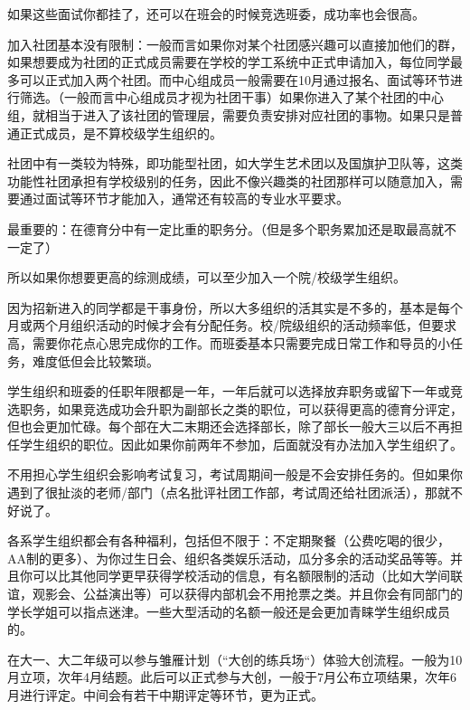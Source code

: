 如果这些面试你都挂了，还可以在班会的时候竞选班委，成功率也会很高。

加入社团基本没有限制：一般而言如果你对某个社团感兴趣可以直接加他们的群，如果想要成为社团的正式成员需要在学校的学工系统中正式申请加入，每位同学最多可以正式加入两个社团。而中心组成员一般需要在10月通过报名、面试等环节进行筛选。（一般而言中心组成员才视为社团干事）如果你进入了某个社团的中心组，就相当于进入了该社团的管理层，需要负责安排对应社团的事物。如果只是普通正式成员，是不算校级学生组织的。

社团中有一类较为特殊，即功能型社团，如大学生艺术团以及国旗护卫队等，这类功能性社团承担有学校级别的任务，因此不像兴趣类的社团那样可以随意加入，需要通过面试等环节才能加入，通常还有较高的专业水平要求。



最重要的：在德育分中有一定比重的职务分。（但是多个职务累加还是取最高就不一定了）

所以如果你想要更高的综测成绩，可以至少加入一个院/校级学生组织。

因为招新进入的同学都是干事身份，所以大多组织的活其实是不多的，基本是每个月或两个月组织活动的时候才会有分配任务。校/院级组织的活动频率低，但要求高，需要你花点心思完成你的工作。而班委基本只需要完成日常工作和导员的小任务，难度低但会比较繁琐。

学生组织和班委的任职年限都是一年，一年后就可以选择放弃职务或留下一年或竞选职务，如果竞选成功会升职为副部长之类的职位，可以获得更高的德育分评定，但也会更加忙碌。每个部在大二末期还会选择部长，除了部长一般大三以后不再担任学生组织的职位。因此如果你前两年不参加，后面就没有办法加入学生组织了。

不用担心学生组织会影响考试复习，考试周期间一般是不会安排任务的。但如果你遇到了很扯淡的老师/部门（点名批评社团工作部，考试周还给社团派活），那就不好说了。

各系学生组织都会有各种福利，包括但不限于：不定期聚餐（公费吃喝的很少，AA制的更多）、为你过生日会、组织各类娱乐活动，瓜分多余的活动奖品等等。并且你可以比其他同学更早获得学校活动的信息，有名额限制的活动（比如大学间联谊，观影会、公益演出等）可以获得内部机会不用抢票之类。并且你会有同部门的学长学姐可以指点迷津。一些大型活动的名额一般还是会更加青睐学生组织成员的。


在大一、大二年级可以参与雏雁计划（“大创的练兵场“）体验大创流程。一般为10月立项，次年4月结题。此后可以正式参与大创，一般于7月公布立项结果，次年6月进行评定。中间会有若干中期评定等环节，更为正式。

